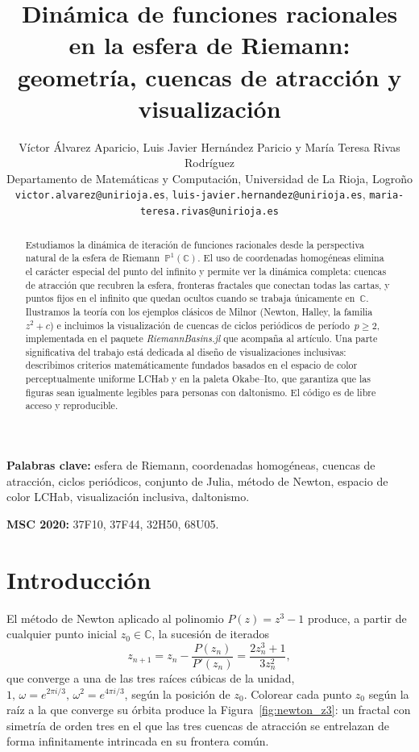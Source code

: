 \documentclass[11pt,a4paper]{article}
\title{\textbf{Dinámica de funciones racionales en la esfera de Riemann:
       geometría, cuencas de atracción y visualización}}
\author{Víctor Álvarez Aparicio,
        Luis Javier Hernández Paricio
        y María Teresa Rivas Rodríguez\\
        {\small Departamento de Matemáticas y Computación,
        Universidad de La Rioja, Logroño}\\
        {\small \texttt{victor.alvarez@unirioja.es},
        \texttt{luis-javier.hernandez@unirioja.es},
        \texttt{maria-teresa.rivas@unirioja.es}}}
\date{} %
\theoremstyle{plain}
\theoremstyle{definition}
\theoremstyle{remark}
\newcommand{\C}{\mathbb{C}}
\newcommand{\Puno}{\mathbb{P}^1(\mathbb{C})}
\newcommand{\pkg}[1]{\textsl{#1}}
\begin{document}

\maketitle

\begin{abstract}
Estudiamos la dinámica de iteración de funciones racionales desde la
perspectiva natural de la esfera de Riemann~$\Puno$.
El uso de coordenadas homogéneas elimina el carácter especial del punto
del infinito y permite ver la dinámica completa: cuencas de atracción
que recubren la esfera, fronteras fractales que conectan todas las
cartas, y puntos fijos en el infinito que quedan ocultos cuando se
trabaja únicamente en~$\C$.
Ilustramos la teoría con los ejemplos clásicos de Milnor (Newton,
Halley, la familia $z^2+c$) e incluimos la visualización de cuencas
de ciclos periódicos de período~$p\geq 2$, implementada en el paquete
\pkg{RiemannBasins.jl} que acompaña al artículo.
Una parte significativa del trabajo está dedicada al diseño de
visualizaciones inclusivas: describimos criterios matemáticamente
fundados basados en el espacio de color perceptualmente uniforme LCHab
y en la paleta Okabe--Ito, que garantiza que las figuras sean
igualmente legibles para personas con daltonismo.
El código es de libre acceso y reproducible.
\end{abstract}

\bigskip
\noindent\textbf{Palabras clave:} esfera de Riemann, coordenadas homogéneas,
cuencas de atracción, ciclos periódicos, conjunto de Julia, método de Newton,
espacio de color LCHab, visualización inclusiva, daltonismo.

\medskip
\noindent\textbf{MSC 2020:} 37F10, 37F44, 32H50, 68U05.

\section{Introducción}

El método de Newton aplicado al polinomio $P(z)=z^3-1$ produce, a partir
de cualquier punto inicial $z_0\in\C$, la sucesión de iterados
\[
   z_{n+1} = z_n - \frac{P(z_n)}{P'(z_n)}
           = \frac{2z_n^3+1}{3z_n^2},
\]
que converge a una de las tres raíces cúbicas de la unidad,
$1,\,\omega=e^{2\pi i/3},\,\omega^2=e^{4\pi i/3}$, según la posición de
$z_0$.
Colorear cada punto $z_0$ según la raíz a la que converge su órbita
produce la Figura~\ref{fig:newton_z3}: un fractal con simetría de orden
tres en el que las tres cuencas de atracción se entrelazan de forma
infinitamente intrincada en su frontera común.
\end{document}
